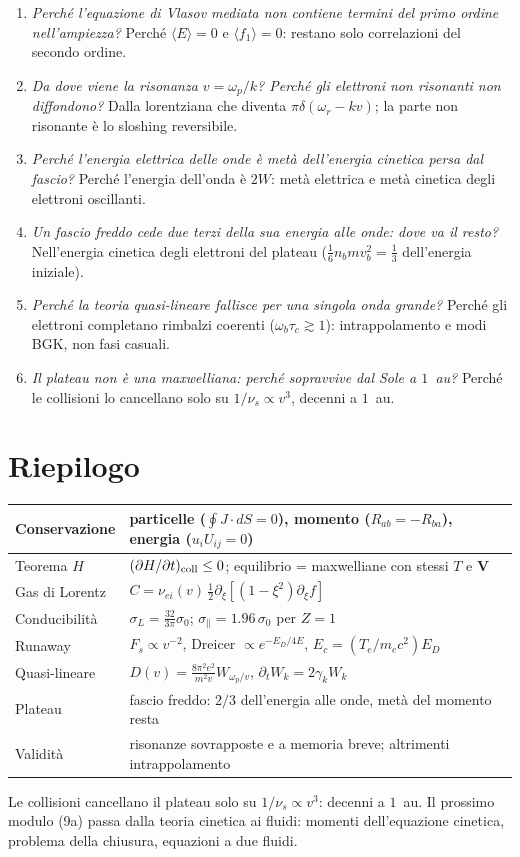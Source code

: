 \begin{enumerate}
\item \textit{Perché l'equazione di Vlasov mediata non contiene termini del primo ordine nell'ampiezza?} Perché $\langle E\rangle=0$ e $\langle f_1\rangle=0$: restano solo correlazioni del secondo ordine.
\item \textit{Da dove viene la risonanza $v=\omega_p/k$? Perché gli elettroni non risonanti non diffondono?} Dalla lorentziana che diventa $\pi\delta(\omega_r-kv)$; la parte non risonante è lo sloshing reversibile.
\item \textit{Perché l'energia elettrica delle onde è metà dell'energia cinetica persa dal fascio?} Perché l'energia dell'onda è $2W$: metà elettrica e metà cinetica degli elettroni oscillanti.
\item \textit{Un fascio freddo cede due terzi della sua energia alle onde: dove va il resto?} Nell'energia cinetica degli elettroni del plateau ($\frac16n_bmv_b^2=\frac13$ dell'energia iniziale).
\item \textit{Perché la teoria quasi-lineare fallisce per una singola onda grande?} Perché gli elettroni completano rimbalzi coerenti ($\omega_b\tau_c\gtrsim1$): intrappolamento e modi BGK, non fasi casuali.
\item \textit{Il plateau non è una maxwelliana: perché sopravvive dal Sole a $1$~au?} Perché le collisioni lo cancellano solo su $1/\nu_s\propto v^3$, decenni a $1$~au.
\end{enumerate}

\section{Riepilogo}
\begin{center}
\small
\begin{tabular}{|l|l|}
\hline
Conservazione & particelle ($\oint J\cdot dS=0$), momento ($R_{ab}=-R_{ba}$), energia ($u_iU_{ij}=0$)\\
\hline
Teorema $H$ & $(\partial H/\partial t)_{\rm coll}\le0$; equilibrio = maxwelliane con stessi $T$ e $\mathbf{V}$\\
\hline
Gas di Lorentz & $C=\nu_{ei}(v)\,\frac12\partial_\xi[(1-\xi^2)\partial_\xi f]$\\
\hline
Conducibilità & $\sigma_L=\frac{32}{3\pi}\sigma_0$; $\sigma_\parallel=1.96\,\sigma_0$ per $Z=1$\\
\hline
Runaway & $F_s\propto v^{-2}$, Dreicer $\propto e^{-E_D/4E}$, $E_c=(T_e/m_ec^2)E_D$\\
\hline
Quasi-lineare & $D(v)=\frac{8\pi^2e^2}{m^2v}W_{\omega_p/v}$, $\partial_tW_k=2\gamma_kW_k$\\
\hline
Plateau & fascio freddo: $2/3$ dell'energia alle onde, metà del momento resta\\
\hline
Validità & risonanze sovrapposte e a memoria breve; altrimenti intrappolamento\\
\hline
\end{tabular}
\end{center}
Le collisioni cancellano il plateau solo su $1/\nu_s\propto v^3$: decenni a $1$~au. Il prossimo modulo (9a) passa dalla teoria cinetica ai fluidi: momenti dell'equazione cinetica, problema della chiusura, equazioni a due fluidi.

